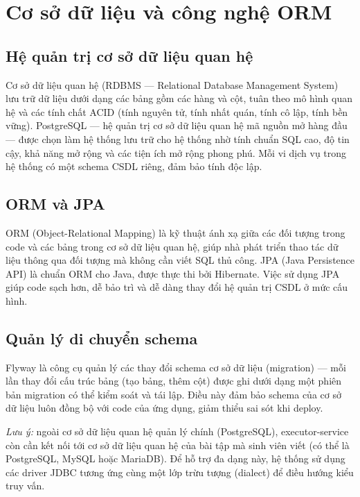 \documentclass[../BTL.tex]{subfiles}
\begin{document}
\section{Cơ sở dữ liệu và công nghệ ORM}
\label{section:2.4}

\subsection{Hệ quản trị cơ sở dữ liệu quan hệ}
\label{section:2.4.1}

Cơ sở dữ liệu quan hệ (RDBMS --- Relational Database Management System) lưu trữ dữ liệu dưới dạng các bảng gồm các hàng và cột, tuân theo mô hình quan hệ và các tính chất ACID (tính nguyên tử, tính nhất quán, tính cô lập, tính bền vững). PostgreSQL --- hệ quản trị cơ sở dữ liệu quan hệ mã nguồn mở hàng đầu --- được chọn làm hệ thống lưu trữ cho hệ thống nhờ tính chuẩn SQL cao, độ tin cậy, khả năng mở rộng và các tiện ích mở rộng phong phú. Mỗi vi dịch vụ trong hệ thống có một schema CSDL riêng, đảm bảo tính độc lập.

\subsection{ORM và JPA}
\label{section:2.4.2}

ORM (Object-Relational Mapping) là kỹ thuật ánh xạ giữa các đối tượng trong code và các bảng trong cơ sở dữ liệu quan hệ, giúp nhà phát triển thao tác dữ liệu thông qua đối tượng mà không cần viết SQL thủ công. JPA (Java Persistence API) là chuẩn ORM cho Java, được thực thi bởi Hibernate. Việc sử dụng JPA giúp code sạch hơn, dễ bảo trì và dễ dàng thay đổi hệ quản trị CSDL ở mức cấu hình.

\subsection{Quản lý di chuyển schema}
\label{section:2.4.3}

Flyway là công cụ quản lý các thay đổi schema cơ sở dữ liệu (migration) --- mỗi lần thay đổi cấu trúc bảng (tạo bảng, thêm cột) được ghi dưới dạng một phiên bản migration có thể kiểm soát và tái lập. Điều này đảm bảo schema của cơ sở dữ liệu luôn đồng bộ với code của ứng dụng, giảm thiểu sai sót khi deploy.

\textit{Lưu ý:} ngoài cơ sở dữ liệu quan hệ quản lý chính (PostgreSQL), executor-service còn cần kết nối tới cơ sở dữ liệu quan hệ của bài tập mà sinh viên viết (có thể là PostgreSQL, MySQL hoặc MariaDB). Để hỗ trợ đa dạng này, hệ thống sử dụng các driver JDBC tương ứng cùng một lớp trừu tượng (dialect) để điều hướng kiểu truy vấn.
\end{document}
